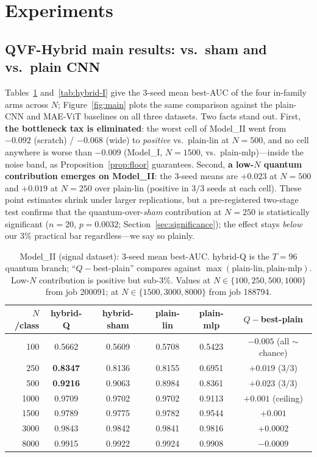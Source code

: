 \documentclass[10pt,letterpaper]{article}
\theoremstyle{plain}
\theoremstyle{definition}
\newcommand{\win}[1]{\textcolor{good}{\textbf{#1}}}
\begin{document}
\section{Experiments}
\label{sec:experiments}

\subsection{QVF-Hybrid main results: vs.\ sham and vs.\ plain CNN}
\label{sec:hybrid-main}

Tables~\ref{tab:hybrid-II} and~\ref{tab:hybrid-I} give the $3$-seed mean best-AUC
of the four in-family arms across $N$; Figure~\ref{fig:main} plots the same
comparison against the plain-CNN and MAE-ViT baselines on all three datasets.
Two facts stand out.
First, \textbf{the bottleneck tax is eliminated}: the worst cell of Model\_II went
from $-0.092$ (scratch) / $-0.068$ (wide) to \emph{positive} vs.\ plain-lin at
$N{=}500$, and no cell anywhere is worse than $-0.009$ (Model\_I, $N{=}1500$, vs.\
plain-mlp)---inside the noise band, as Proposition~\ref{prop:floor} guarantees.
Second, \textbf{a low-$N$ quantum contribution emerges on Model\_II}:
the $3$-seed means are $+0.023$ at $N{=}500$ and $+0.019$ at $N{=}250$ over
plain-lin (positive in $3/3$ seeds at each cell). These point estimates shrink
under larger replications, but a pre-registered two-stage test confirms that the
quantum-over-\emph{sham} contribution at $N{=}250$ is statistically significant
($n{=}20$, $p{=}0.0032$; Section~\ref{sec:significance}); the effect stays
\emph{below} our $3\%$ practical bar regardless---we say so plainly.

\begin{table}[h!]
\centering
\caption{Model\_II (signal dataset): $3$-seed mean best-AUC. hybrid-Q is the
$T{=}96$ quantum branch; ``$Q-$best-plain'' compares against
$\max(\text{plain-lin},\text{plain-mlp})$. Low-$N$ contribution is positive but
sub-$3\%$. Values at $N\in\{100,250,500,1000\}$ from job 200091; at
$N\in\{1500,3000,8000\}$ from job 188794.}
\label{tab:hybrid-II}
\begin{tabular}{@{}rccccc@{}}
\toprule
$N$/class & hybrid-Q & hybrid-sham & plain-lin & plain-mlp & $Q-$best-plain \\
\midrule
100  & 0.5662 & 0.5609 & 0.5708 & 0.5423 & $-0.005$ (all $\sim$chance) \\
\rowcolor{rowhi}
250  & \win{0.8347} & 0.8136 & 0.8155 & 0.6951 & \win{$+0.019$} ($3/3$) \\
\rowcolor{rowhi}
500  & \win{0.9216} & 0.9063 & 0.8984 & 0.8361 & \win{$+0.023$} ($3/3$) \\
1000 & 0.9709 & 0.9702 & 0.9702 & 0.9113 & $+0.001$ (ceiling) \\
1500 & 0.9789 & 0.9775 & 0.9782 & 0.9544 & $+0.001$ \\
3000 & 0.9843 & 0.9842 & 0.9841 & 0.9816 & $+0.0002$ \\
8000 & 0.9915 & 0.9922 & 0.9924 & 0.9908 & $-0.0009$ \\
\bottomrule
\end{tabular}
\end{table}
\end{document}

